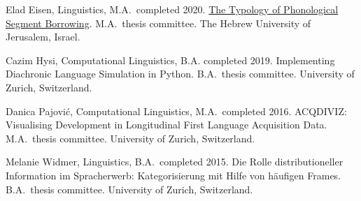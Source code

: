 \documentclass[11pt]{article}
\newcommand{\hangpara}{
 \setlength{\parindent}{0in} %
 \hangindent=0.42in %
}
\begin{document}
\hangpara
\vskip 6pt
Elad Eisen, Linguistics, M.A.\ completed 2020. \href{https://www.researchgate.net/publication/341734023_The_Typology_of_Phonological_Segment_Borrowing}{The Typology of Phonological Segment Borrowing}. M.A.\ thesis committee. The Hebrew University of Jerusalem, Israel.

\hangpara
\vskip 6pt
Cazim Hysi, Computational Linguistics, B.A. completed 2019. Implementing Diachronic Language Simulation in Python. B.A.\ thesis committee. University of Zurich, Switzerland.

\hangpara
\vskip 6pt
Danica Pajovi{\'c}, Computational Linguistics, M.A.\ completed 2016. ACQDIVIZ: Visualising Development in Longitudinal First Language Acquisition Data. M.A.\ thesis committee. University of Zurich, Switzerland.

\vskip 6pt
\hangpara
Melanie Widmer, Linguistics, B.A.\ completed 2015. Die Rolle distributioneller Information im Spracherwerb: Kategorisierung mit Hilfe von h{\"a}ufigen Frames. B.A.\ thesis committee. University of Zurich, Switzerland.

\end{document}
